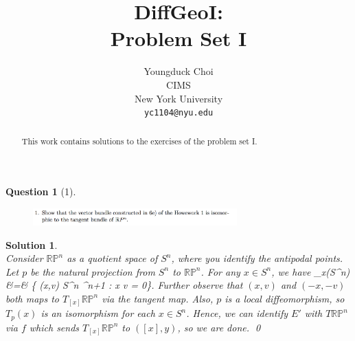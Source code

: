 \documentclass{article} %
\title{DiffGeoI: \\
Problem Set I}
\author{
Youngduck Choi \\
CIMS \\
New York University\\
\texttt{yc1104@nyu.edu} \\
}
\def\eQb#1\eQe{\begin{eqnarray*}#1\end{eqnarray*}}
\theoremstyle{quest}
\newtheorem*{question}{Question}
\newtheorem*{solution}{Solution}
\begin{document}
\maketitle

\begin{abstract}
This work contains solutions to the exercises of the problem set I.
\end{abstract}

\bigskip

\begin{question}[1]
\hfill
\begin{figure}[h!]
  \centering
    \includegraphics[width=0.7\textwidth]{DG-e3-p1.png}
\end{figure}
\end{question}
\begin{solution} \hfill \\
Consider $\mathbb{RP}^n$ as a quotient space of $S^n$, where you identify
the antipodal points. Let $p$ be the natural projection from $S^n$ to $\mathbb{RP}^n$.
For any $x \in S^n$, we have
\eQb
T_x(S^n) &=& \{ (x,v) \in S^n \times {}^{n+1} : x \cdot v = 0\}.
\eQe
Further observe that $(x,v)$ and $(-x,-v)$ both maps to $T_{[x]}\mathbb{RP}^n$
via the tangent map. Also, $p$ is a local diffeomorphism, so $T_p(x)$ is an isomorphism
for each $x \in S^n$. Hence, we can identify $E'$ with $T\mathbb{RP}^{n}$ via 
$f$ which sends $T_{[x]}\mathbb{RP}^{n}$ to  $([x],y)$, so we are done. \hfill
\qed 

\end{solution}

\bigskip
\end{document}
